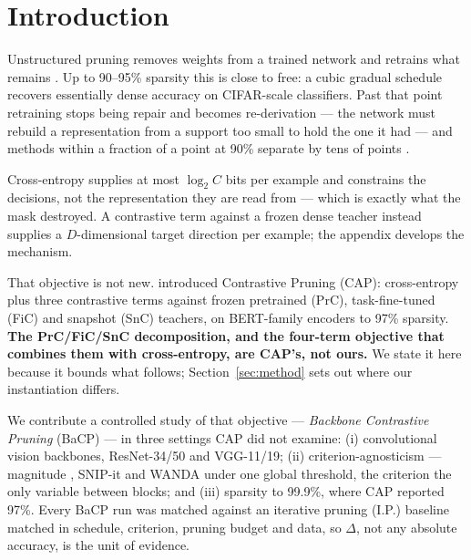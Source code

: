 \section{Introduction}
\label{sec:intro}

Unstructured pruning removes weights from a trained network and retrains what
remains \citep{han2015learning}. Up to 90--95\% sparsity this is close to free:
a cubic gradual schedule \citep{zhu2018prune,gale2019state} recovers essentially
dense accuracy on CIFAR-scale classifiers. Past that point retraining stops
being repair and becomes re-derivation --- the network must rebuild a
representation from a support too small to hold the one it had --- and methods
within a fraction of a point at 90\% separate by tens of points
\citep{li2025east}.

Cross-entropy supplies at most $\log_2 C$ bits per example and constrains the
decisions, not the representation they are read from --- which is exactly what
the mask destroyed. A contrastive term against a frozen dense teacher instead
supplies a $D$-dimensional target direction per example; the appendix develops
the mechanism.

That objective is not new. \citet{xu2022cap} introduced Contrastive Pruning
(CAP): cross-entropy plus three contrastive terms against frozen pretrained
(PrC), task-fine-tuned (FiC) and snapshot (SnC) teachers, on BERT-family
encoders to 97\% sparsity. \textbf{The PrC/FiC/SnC decomposition, and the
four-term objective that combines them with cross-entropy, are CAP's, not
ours.} We state it here because it bounds what follows;
Section~\ref{sec:method} sets out where our instantiation differs.

We contribute a controlled study of that objective --- \emph{Backbone
Contrastive Pruning} (BaCP) --- in three settings CAP did not examine:
(i) convolutional vision backbones, ResNet-34/50 and VGG-11/19;
(ii) criterion-agnosticism --- magnitude \citep{han2015learning}, SNIP-it
\citep{lee2019snip,verdenius2020snipit} and WANDA \citep{sun2024wanda} under one
global threshold, the criterion the only variable between blocks; and
(iii) sparsity to 99.9\%, where CAP reported 97\%. Every BaCP run was matched
against an iterative pruning (I.P.) baseline matched in schedule, criterion,
pruning budget and data, so $\Delta$, not any absolute accuracy, is
the unit of evidence.

